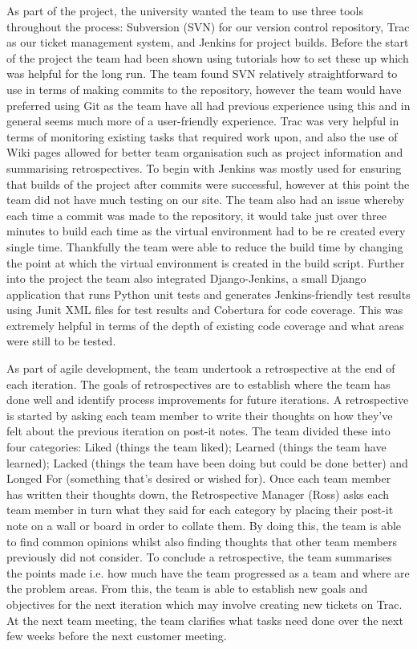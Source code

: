 \documentclass{l3proj}
\begin{document}
As part of the project, the university wanted the team to use three tools throughout the process: Subversion (SVN) for our version control repository, Trac as our ticket management system, and Jenkins for project builds. Before the start of the project the team had been shown using tutorials how to set these up which was helpful for the long run. The team found SVN relatively straightforward to use in terms of making commits to the repository, however the team would have preferred using Git as the team have all had previous experience using this and in general seems much more of a user-friendly experience. Trac was very helpful in terms of monitoring existing tasks that required work upon, and also the use of Wiki pages allowed for better team organisation such as project information and summarising retrospectives. To begin with Jenkins was mostly used for ensuring that builds of the project after commits were successful, however at this point the team did not have much testing on our site. The team also had an issue whereby each time a commit was made to the repository, it would take just over three minutes to build each time as the virtual environment had to be re created every single time. Thankfully the team were able to reduce the build time by changing the point at which the virtual environment is created in the build script. Further into the project the team also integrated Django-Jenkins, a small Django application that runs Python unit tests and generates Jenkins-friendly test results using Junit XML files for test results and Cobertura for code coverage. This was extremely helpful in terms of the depth of existing code coverage and what areas were still to be tested.

As part of agile development, the team undertook a retrospective at the end of each iteration. The goals of retrospectives are to establish where the team has done well and identify process improvements for future iterations. A retrospective is started by asking each team member to write their thoughts on how they've felt about the previous iteration on post-it notes. The team divided these into four categories: Liked (things the team liked); Learned (things the team have learned); Lacked (things the team have been doing but could be done better) and Longed For (something that's desired or wished for). Once each team member has written their thoughts down, the Retrospective Manager (Ross) asks each team member in turn what they said for each category by placing their post-it note on a wall or board in order to collate them. By doing this, the team is able to find common opinions whilst also finding thoughts that other team members previously did not consider. To conclude a retrospective, the team summarises the points made i.e. how much have the team progressed as a team and where are the problem areas. From this, the team is able to establish new goals and objectives for the next iteration which may involve creating new tickets on Trac. At the next team meeting, the team clarifies what tasks need done over the next few weeks before the next customer meeting.
\end{document}
